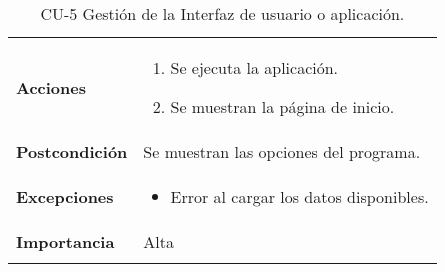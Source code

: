 \begin{longtable}[h!]{@{}ll@{}}
\begin{minipage}[t]{0.23\columnwidth}
\textbf{Acciones}\strut
\end{minipage} & \begin{minipage}[t]{0.71\columnwidth}\raggedright\strut
\begin{enumerate}
\def\labelenumi{\arabic{enumi}.}
\tightlist
\item
  Se ejecuta la aplicación.
\item
  Se muestran la página de inicio.
\end{enumerate}\strut
\end{minipage}\tabularnewline
\begin{minipage}[t]{0.23\columnwidth}\raggedright\strut
\textbf{Postcondición}\strut
\end{minipage} & \begin{minipage}[t]{0.71\columnwidth}\raggedright\strut
Se muestran las opciones del programa.\strut
\end{minipage}\tabularnewline
\begin{minipage}[t]{0.23\columnwidth}\raggedright\strut
\textbf{Excepciones}\strut
\end{minipage} & \begin{minipage}[t]{0.71\columnwidth}\raggedright\strut
\begin{itemize}
\tightlist
\item
  Error al cargar los datos disponibles.
\end{itemize}\strut
\end{minipage}\tabularnewline
\begin{minipage}[t]{0.23\columnwidth}\raggedright\strut
\textbf{Importancia}\strut
\end{minipage} & \begin{minipage}[t]{0.71\columnwidth}\raggedright\strut
Alta\strut
\end{minipage}\tabularnewline
\bottomrule
\caption{CU-5 Gestión de la Interfaz de usuario o aplicación.}
\end{longtable}



